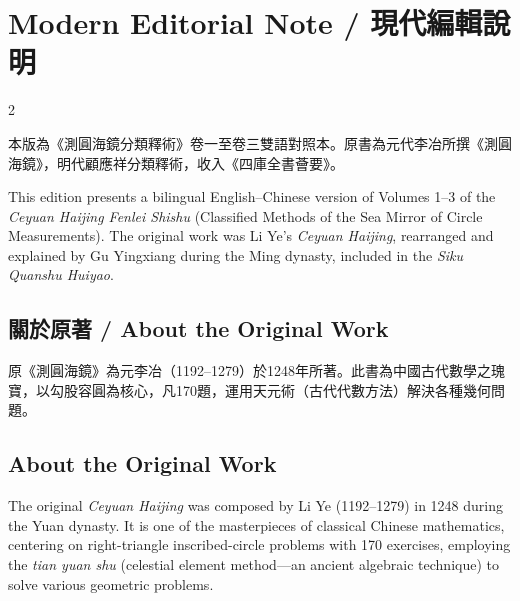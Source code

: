 \documentclass[11pt,a4paper]{article}
\newcounter{problem}[section]
\begin{document}
\clearpage

\section*{Modern Editorial Note / 現代編輯說明}

\begin{paracol}{2}

本版為《測圓海鏡分類釋術》卷一至卷三雙語對照本。原書為元代李冶所撰《測圓海鏡》，明代顧應祥分類釋術，收入《四庫全書薈要》。

\switchcolumn

This edition presents a bilingual English--Chinese version of Volumes 1--3 of the \textit{Ceyuan Haijing Fenlei Shishu} (Classified Methods of the Sea Mirror of Circle Measurements). The original work was Li Ye's \textit{Ceyuan Haijing}, rearranged and explained by Gu Yingxiang during the Ming dynasty, included in the \textit{Siku Quanshu Huiyao}.

\switchcolumn

\subsection*{關於原著 / About the Original Work}

原《測圓海鏡》為元李冶（1192--1279）於1248年所著。此書為中國古代數學之瑰寶，以勾股容圓為核心，凡170題，運用天元術（古代代數方法）解決各種幾何問題。

\switchcolumn

\subsection*{About the Original Work}

The original \textit{Ceyuan Haijing} was composed by Li Ye (1192--1279) in 1248 during the Yuan dynasty. It is one of the masterpieces of classical Chinese mathematics, centering on right-triangle inscribed-circle problems with 170 exercises, employing the \textit{tian yuan shu} (celestial element method---an ancient algebraic technique) to solve various geometric problems.

\switchcolumn


\end{paracol}
\end{document}
